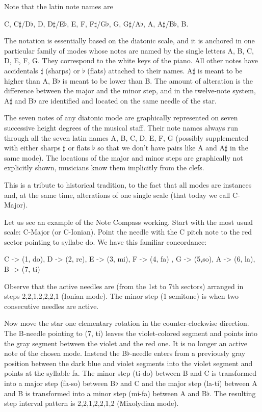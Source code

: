 Note that the latin note names are
\begin{center}
C, C$\sharp$/D$\flat$, D, D$\sharp$/E$\flat$, E, F, F$\sharp$/G$\flat$, G, G$\sharp$/A$\flat$, A, A$\sharp$/B$\flat$, B.
\end{center}
The notation is essentially based on the diatonic scale, and it is anchored in one particular family of modes whose notes are named  by the single letters  A, B, C, D, E, F, G. They correspond to the white keys of the piano. All other  notes have accidentals $\sharp$ (sharps) or $\flat$ (flats) attached to their  names. A$\sharp$ is meant to be higher than A,  B$\flat$ is meant to be lower than B. The amount of alteration is the difference between the major and the minor step, and in the twelve-note system, A$\sharp$ and B$\flat$ are identified and located on the same needle of the star.

The seven notes of any diatonic mode are graphically represented on seven successive height degrees of the musical staff. Their note names always run through all the seven latin names A, B, C, D, E, F, G (possibly supplemented with either sharps $\sharp$ or flats $\flat$ so that we don't have pairs like A and A$\sharp$ in the same mode). The locations of the major and minor steps are graphically not explicitly shown, musicians know them implicitly from the clefs.

This is a tribute to historical tradition, to the fact that all modes are instances and, at the same time, alterations of one single scale (that today we call C-Major).

Let us see an example of the Note Compass working. Start with the most usual scale: C-Major (or C-Ionian). Point the needle with the C pitch note to the red sector pointing to syllabe do. We have this familiar concordance:

C -> (1, do), D -> (2, re), E -> (3, mi), F -> (4, fa) , G -> (5,so), A -> (6, la), B -> (7, ti)

Observe that the active needles are (from the 1st to 7th sectors) arranged in steps  2,2,1,2,2,2,1 (Ionian mode). The minor step (1 semitone) is when two consecutive needles are active.

Now move the star one elementary rotation in the counter-clockwise direction. The B-needle pointing to (7, ti) leaves the violet-colored segment and points into the gray segment between the violet and the red one. It is no longer an active note of the chosen mode. Instead the B$\flat$-needle enters from a previously gray position between the dark blue and violet segments into the violet segment and points at the syllable fa. The minor step (ti-do) between B and C is transformed into a major step (fa-so) between B$\flat$ and C and the major step (la-ti) between A and B is transformed into a minor step (mi-fa) between A and B$\flat$. The resulting step interval pattern is 2,2,1,2,2,1,2 (Mixolydian mode).

